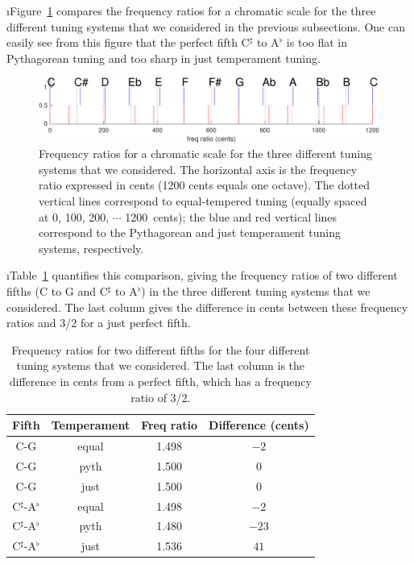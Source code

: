 \i Figure~\ref{f:comparetemperaments} compares
the frequency ratios for a chromatic scale for
the three different tuning systems that we considered
in the previous subsections. 
One can easily see from this figure
that the perfect fifth C$^\sharp$ to A$^\flat$ is too flat in
Pythagorean tuning and too sharp in just temperament
tuning.
%
\begin{figure}[htbp]
\begin{center}
\includegraphics[width=.8\textwidth]{comparetemperaments.pdf}
\caption{Frequency ratios for a chromatic scale for 
the three different tuning systems that we considered.
The horizontal axis is the frequency ratio expressed in
cents (1200 cents equals one octave).
The dotted vertical lines correspond to equal-tempered
tuning (equally spaced at 0, 100, 200, $\cdots$ 1200~cents);
the blue and red vertical lines correspond to 
the Pythagorean and just temperament tuning systems, respectively.}
\label{f:comparetemperaments}
\end{center}
\end{figure}

\i Table~\ref{t:fifths} quantifies this comparison, 
giving the frequency ratios of two different fifths
(C to G and C$^\sharp$ to A$^\flat$) in the three different
tuning systems that we considered.
The last column gives the difference in cents between 
these frequency ratios and 3/2 for a just perfect fifth.
%
\begin{table}[htbp]
\begin{center}
\begin{tabular}{|c|c|c|c|}
\hline
Fifth & Temperament & Freq ratio & Difference (cents) \\
\hline
C-G & equal & 1.498 & $-2$ \\
C-G & pyth & 1.500 & $0$ \\
C-G & just & 1.500 & $0$ \\
C$^\sharp$-A$^\flat$ & equal & 1.498 & $-2$ \\
C$^\sharp$-A$^\flat$ & pyth & 1.480 & $-23$ \\
C$^\sharp$-A$^\flat$ & just & 1.536 & $41$ \\
\hline
\end{tabular}
\caption{Frequency ratios for two different fifths
for the four different tuning systems that we considered.
The last column is the difference in cents from
a perfect fifth, which has a frequency ratio of 3/2.}
\label{t:fifths}
\end{center}
\end{table}

